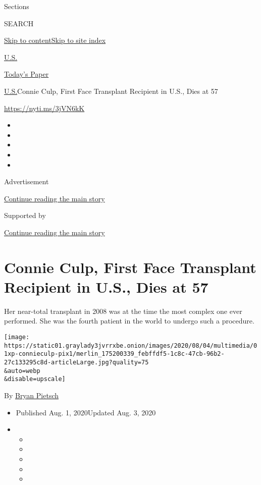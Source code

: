 Sections

SEARCH

\protect\hyperlink{site-content}{Skip to
content}\protect\hyperlink{site-index}{Skip to site index}

\href{https://www.nytimes3xbfgragh.onion/section/us}{U.S.}

\href{https://myaccount.nytimes3xbfgragh.onion/auth/login?response_type=cookie\&client_id=vi}{}

\href{https://www.nytimes3xbfgragh.onion/section/todayspaper}{Today's
Paper}

\href{/section/us}{U.S.}\textbar{}Connie Culp, First Face Transplant
Recipient in U.S., Dies at 57

\url{https://nyti.ms/3jVN6kK}

\begin{itemize}
\item
\item
\item
\item
\item
\end{itemize}

Advertisement

\protect\hyperlink{after-top}{Continue reading the main story}

Supported by

\protect\hyperlink{after-sponsor}{Continue reading the main story}

\hypertarget{connie-culp-first-face-transplant-recipient-in-us-dies-at-57}{%
\section{Connie Culp, First Face Transplant Recipient in U.S., Dies at
57}\label{connie-culp-first-face-transplant-recipient-in-us-dies-at-57}}

Her near-total transplant in 2008 was at the time the most complex one
ever performed. She was the fourth patient in the world to undergo such
a procedure.

\texttt{[image: https://static01.graylady3jvrrxbe.onion/images/2020/08/04/multimedia/01xp-connieculp-pix1/merlin\_175200339\_febffdf5-1c8c-47cb-96b2-27c133295c8d-articleLarge.jpg?quality=75\\\&auto=webp\\\&disable=upscale]}

By \href{https://www.nytimes3xbfgragh.onion/by/bryan-pietsch}{Bryan
Pietsch}

\begin{itemize}
\item
  Published Aug. 1, 2020Updated Aug. 3, 2020
\item
  \begin{itemize}
  \item
  \item
  \item
  \item
  \item
  \end{itemize}
\end{itemize}

